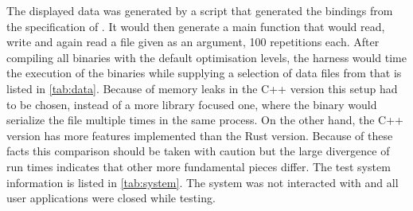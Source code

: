 \documentclass[thesis]{subfiles}
\begin{document}
  The displayed data was generated by a script that generated the bindings from the specification of \autocite{skill-llvm}.
  It would then generate a main function that would read, write and again read a file given as an argument, 100 repetitions each.
  After compiling all binaries with the default optimisation levels, the harness would time the execution of the binaries while supplying a selection of data files from \autocite{skill-llvm} that is listed in \autoref{tab:data}.
  Because of memory leaks in the C++ version this setup had to be chosen, instead of a more library focused one, where the binary would serialize the file multiple times in the same process.
  On the other hand, the C++ version has more features implemented than the Rust version.
  Because of these facts this comparison should be taken with caution but the large divergence of run times indicates that other more fundamental pieces differ.
  The test system information is listed in \autoref{tab:system}.
  The system was not interacted with and all user applications were closed while testing.
\end{document}
